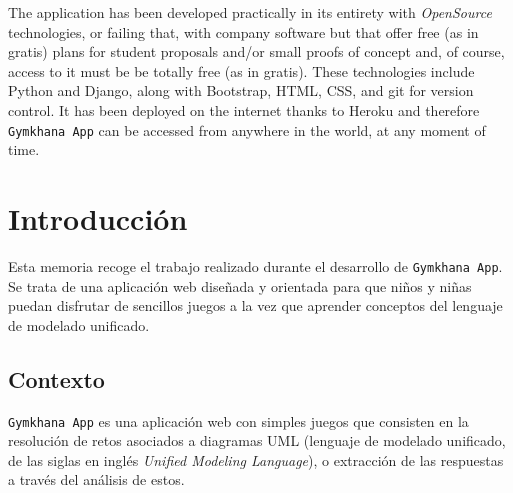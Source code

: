 \documentclass[a4paper, 12pt]{book}
\begin{document}
The application has been developed practically in its entirety with \emph{OpenSource} technologies, or failing that, with company software but that offer free (as in gratis) plans for student proposals and/or small proofs of concept and, of course, access to it must be be totally free (as in gratis). These technologies include Python and Django, along with Bootstrap, HTML, CSS, and git for version control. It has been deployed on the internet thanks to Heroku and therefore \texttt{Gymkhana App} can be accessed from anywhere in the world, at any moment of time.




\tableofcontents 
\cleardoublepage
\listoffigures %



\cleardoublepage
\chapter{Introducción}
\label{sec:intro} %

Esta memoria recoge el trabajo realizado durante el desarrollo de \texttt{Gymkhana App}. Se trata de una aplicación web diseñada y orientada para que niños y niñas puedan disfrutar de sencillos juegos a la vez que aprender conceptos del lenguaje de modelado unificado.

\section{Contexto}
\label{sec:seccion}
\texttt{Gymkhana App} es una aplicación web con simples juegos que consisten en la resolución de retos asociados a diagramas UML (lenguaje de modelado unificado, de las siglas en inglés \emph{Unified Modeling Language}), o extracción de las respuestas a través del análisis de estos. 
\end{document}
